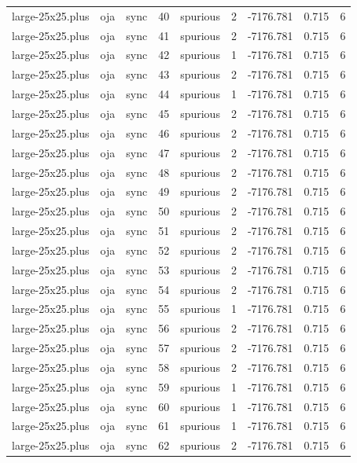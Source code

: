 \begin{tabular}{lllrlrrrr}
large-25x25.plus & oja & sync & 40 & spurious & 2 & -7176.781 & 0.715 & 6 \\
large-25x25.plus & oja & sync & 41 & spurious & 2 & -7176.781 & 0.715 & 6 \\
large-25x25.plus & oja & sync & 42 & spurious & 1 & -7176.781 & 0.715 & 6 \\
large-25x25.plus & oja & sync & 43 & spurious & 2 & -7176.781 & 0.715 & 6 \\
large-25x25.plus & oja & sync & 44 & spurious & 1 & -7176.781 & 0.715 & 6 \\
large-25x25.plus & oja & sync & 45 & spurious & 2 & -7176.781 & 0.715 & 6 \\
large-25x25.plus & oja & sync & 46 & spurious & 2 & -7176.781 & 0.715 & 6 \\
large-25x25.plus & oja & sync & 47 & spurious & 2 & -7176.781 & 0.715 & 6 \\
large-25x25.plus & oja & sync & 48 & spurious & 2 & -7176.781 & 0.715 & 6 \\
large-25x25.plus & oja & sync & 49 & spurious & 2 & -7176.781 & 0.715 & 6 \\
large-25x25.plus & oja & sync & 50 & spurious & 2 & -7176.781 & 0.715 & 6 \\
large-25x25.plus & oja & sync & 51 & spurious & 2 & -7176.781 & 0.715 & 6 \\
large-25x25.plus & oja & sync & 52 & spurious & 2 & -7176.781 & 0.715 & 6 \\
large-25x25.plus & oja & sync & 53 & spurious & 2 & -7176.781 & 0.715 & 6 \\
large-25x25.plus & oja & sync & 54 & spurious & 2 & -7176.781 & 0.715 & 6 \\
large-25x25.plus & oja & sync & 55 & spurious & 1 & -7176.781 & 0.715 & 6 \\
large-25x25.plus & oja & sync & 56 & spurious & 2 & -7176.781 & 0.715 & 6 \\
large-25x25.plus & oja & sync & 57 & spurious & 2 & -7176.781 & 0.715 & 6 \\
large-25x25.plus & oja & sync & 58 & spurious & 2 & -7176.781 & 0.715 & 6 \\
large-25x25.plus & oja & sync & 59 & spurious & 1 & -7176.781 & 0.715 & 6 \\
large-25x25.plus & oja & sync & 60 & spurious & 1 & -7176.781 & 0.715 & 6 \\
large-25x25.plus & oja & sync & 61 & spurious & 1 & -7176.781 & 0.715 & 6 \\
large-25x25.plus & oja & sync & 62 & spurious & 2 & -7176.781 & 0.715 & 6 \\

\end{tabular}

